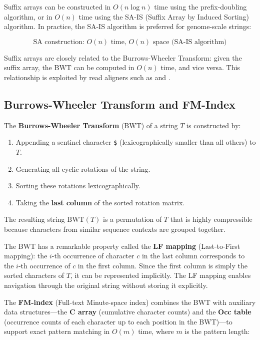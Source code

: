 Suffix arrays can be constructed in $O(n \log n)$ time using the prefix-doubling algorithm, or in $O(n)$ time using the SA-IS (Suffix Array by Induced Sorting) algorithm. In practice, the SA-IS algorithm is preferred for genome-scale strings:

\begin{equation}
\text{SA construction: } O(n) \text{ time, } O(n) \text{ space (SA-IS algorithm)}
\end{equation}

Suffix arrays are closely related to the Burrows-Wheeler Transform: given the suffix array, the BWT can be computed in $O(n)$ time, and vice versa. This relationship is exploited by read aligners such as  and .

\subsection{Burrows-Wheeler Transform and FM-Index}
\label{subsec:bioinf:bwt}

\begin{keyconcept}[title={Burrows-Wheeler Transform}]
The \textbf{Burrows-Wheeler Transform} (BWT) of a string $T$ is constructed by:
\begin{enumerate}[nosep]
  \item Appending a sentinel character \texttt{\$} (lexicographically smaller than all others) to $T$.
  \item Generating all cyclic rotations of the string.
  \item Sorting these rotations lexicographically.
  \item Taking the \textbf{last column} of the sorted rotation matrix.
\end{enumerate}
The resulting string $\text{BWT}(T)$ is a permutation of $T$ that is highly compressible because characters from similar sequence contexts are grouped together.
\end{keyconcept}

The BWT has a remarkable property called the \textbf{LF mapping} (Last-to-First mapping): the $i$-th occurrence of character $c$ in the last column corresponds to the $i$-th occurrence of $c$ in the first column. Since the first column is simply the sorted characters of $T$, it can be represented implicitly. The LF mapping enables navigation through the original string without storing it explicitly.

The \textbf{FM-index} (Full-text Minute-space index) combines the BWT with auxiliary data structures---the \textbf{C array} (cumulative character counts) and the \textbf{Occ table} (occurrence counts of each character up to each position in the BWT)---to support exact pattern matching in $O(m)$ time, where $m$ is the pattern length:

